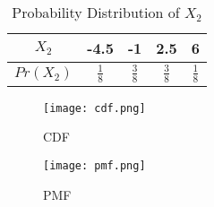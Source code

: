 \documentclass[11pt,a4paper,twocolumn]{article}
\begin{document}
\begin{table}[h!]
    \centering
    \begin{tabular}{|c|c|c|c|c|}
    \hline
         $X_{2}$&-4.5&-1&2.5&6  \\
         \hline
         $Pr(X_{2})$&$\frac{1}{8}$&$\frac{3}{8}$&$\frac{3}{8}$&$\frac{1}{8}$\\
         \hline
    \end{tabular}
    \caption{Probability Distribution of $X_{2}$}
    \label{tab:my_label}
\end{table}
\newpage
\begin{figure}[h!]
    \centering
    \texttt{[image: cdf.png]}
    \caption{CDF}
    \label{fig:my_label}
\end{figure}
\begin{figure}[h!]
    \centering
    \texttt{[image: pmf.png]}
    \caption{PMF}
    \label{fig:my_label}
\end{figure}
\end{document}
